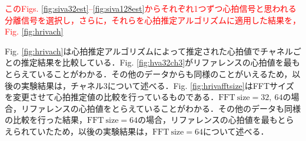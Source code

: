 {\textcolor{red}{このFigs. \ref{fig:siva32est}--\ref{fig:siva128est}からそれぞれ1つずつ心拍信号と思われる分離信号を選択し，さらに，それらを心拍推定アルゴリズムに適用した結果を，Fig. \ref{fig:hrivach}}

Fig. \ref{fig:hrivach}は心拍推定アルゴリズムによって推定された心拍値でチャネルごとの推定結果を比較している．Fig. \ref{fig:hva32ch3}がリファレンスの心拍値を最もとらえていることがわかる．その他のデータからも同様のことがいえるため，以後の実験結果は，チャネル3について述べる．Fig. \ref{fig:hrivafftsize}はFFTサイズを変更させて心拍推定値の比較を行っているものである．$\mathrm{FFT~size}=32,~64$の場合，リファレンスの心拍値をとらえていることがわかる．その他のデータも同様の比較を行った結果，$\mathrm{FFT~size}=64$の場合，リファレンスの心拍値を最もとらえられていたため，以後の実験結果は，$\mathrm{FFT~size}=64$について述べる．






}
